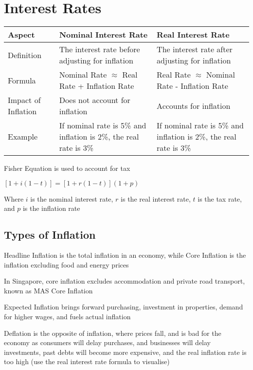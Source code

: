 \section{Interest Rates}

\begin{tabularx}{\linewidth}{|X|X|X|}
\hline
\textbf{Aspect} & \textbf{Nominal Interest Rate} & \textbf{Real Interest Rate} \\
\hline
Definition & The interest rate before adjusting for inflation & The interest rate after adjusting for inflation \\
\hline
Formula & Nominal Rate $\approx$ Real Rate + Inflation Rate & Real Rate $\approx$ Nominal Rate - Inflation Rate\\
\hline
Impact of Inflation & Does not account for inflation & Accounts for inflation \\
\hline
Example & If nominal rate is 5\% and inflation is 2\%, the real rate is 3\% & If nominal rate is 5\% and inflation is 2\%, the real rate is 3\% \\
\hline
\end{tabularx}

Fisher Equation is used to account for tax

$[1+i(1-t)] = [1+r(1-t)](1+p)$

Where $i$ is the nominal interest rate, $r$ is the real interest rate, $t$ is the tax rate, and $p$ is the inflation rate

\subsection{Types of Inflation}
Headline Inflation is the total inflation in an economy, while Core Inflation is the inflation excluding food and energy prices

\begin{callout}
    In Singapore, core inflation excludes accommodation and private road transport, known as MAS Core Inflation
\end{callout}

Expected Inflation brings forward purchasing, investment in properties, demand for higher wages, and fuels actual inflation

Deflation is the opposite of inflation, where prices fall, and is bad for the economy as consumers will delay purchases, 
and businesses will delay investments, past debts will become more expensive, and the real inflation rate is too high
(use the real interest rate formula to visualise)

